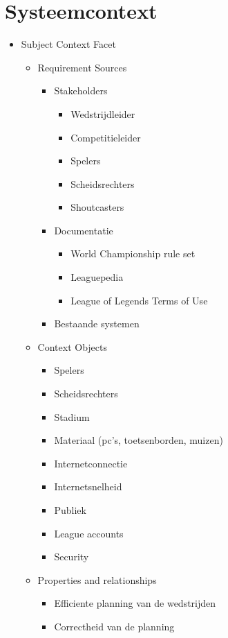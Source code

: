 \documentclass[12pt,a4paper]{article}
\begin{document}
	\section{Systeemcontext}
		\begin{itemize}
			\item Subject Context Facet
			\begin{itemize}
				\item Requirement Sources
				\begin{itemize}
					\item Stakeholders
					\begin{itemize}
						\item Wedstrijdleider
						\item Competitieleider
						\item Spelers
						\item Scheidsrechters
						\item Shoutcasters
					\end{itemize}
					\item Documentatie
					\begin{itemize}
						\item World Championship rule set
						\item Leaguepedia
						\item League of Legends Terms of Use
					\end{itemize}
					\item Bestaande systemen
				\end{itemize}
				\item Context Objects
				\begin{itemize}
					\item Spelers
					\item Scheidsrechters
					\item Stadium
					\item Materiaal (pc's, toetsenborden, muizen)
					\item Internetconnectie
					\item Internetsnelheid
					\item Publiek
					\item League accounts
					\item Security
				\end{itemize}
				\item Properties and relationships
				\begin{itemize}
					\item Efficiente planning van de wedstrijden
					\item Correctheid van de planning

\end{itemize}
\end{itemize}
\end{itemize}
\end{document}
